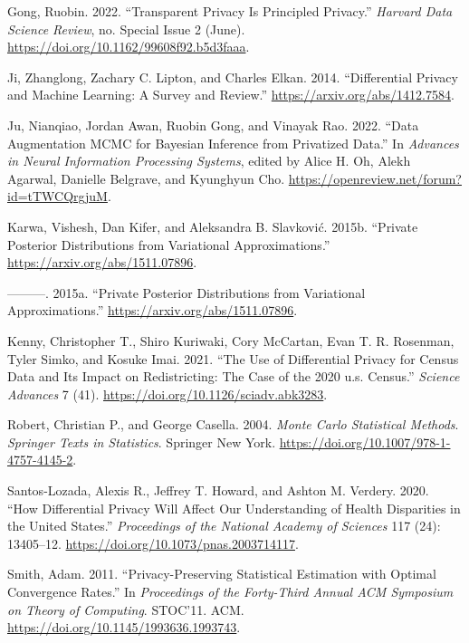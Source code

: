 \begin{CSLReferences}{1}{0}
\leavevmode{}%
Gong, Ruobin. 2022. {``Transparent Privacy Is Principled Privacy.''} \emph{Harvard Data Science Review}, no. Special Issue 2 (June). \url{https://doi.org/10.1162/99608f92.b5d3faaa}.

\leavevmode{}%
Ji, Zhanglong, Zachary C. Lipton, and Charles Elkan. 2014. {``Differential Privacy and Machine Learning: A Survey and Review.''} \url{https://arxiv.org/abs/1412.7584}.

\leavevmode{}%
Ju, Nianqiao, Jordan Awan, Ruobin Gong, and Vinayak Rao. 2022. {``Data Augmentation {MCMC} for Bayesian Inference from Privatized Data.''} In \emph{Advances in Neural Information Processing Systems}, edited by Alice H. Oh, Alekh Agarwal, Danielle Belgrave, and Kyunghyun Cho. \url{https://openreview.net/forum?id=tTWCQrgjuM}.

\leavevmode{}%
Karwa, Vishesh, Dan Kifer, and Aleksandra B. Slavković. 2015b. {``Private Posterior Distributions from Variational Approximations.''} \url{https://arxiv.org/abs/1511.07896}.

\leavevmode{}%
---------. 2015a. {``Private Posterior Distributions from Variational Approximations.''} \url{https://arxiv.org/abs/1511.07896}.

\leavevmode{}%
Kenny, Christopher T., Shiro Kuriwaki, Cory McCartan, Evan T. R. Rosenman, Tyler Simko, and Kosuke Imai. 2021. {``The Use of Differential Privacy for Census Data and Its Impact on Redistricting: The Case of the 2020 u.s. Census.''} \emph{Science Advances} 7 (41). \url{https://doi.org/10.1126/sciadv.abk3283}.

\leavevmode{}%
Robert, Christian P., and George Casella. 2004. \emph{Monte Carlo Statistical Methods}. \emph{Springer Texts in Statistics}. Springer New York. \url{https://doi.org/10.1007/978-1-4757-4145-2}.

\leavevmode{}%
Santos-Lozada, Alexis R., Jeffrey T. Howard, and Ashton M. Verdery. 2020. {``How Differential Privacy Will Affect Our Understanding of Health Disparities in the United States.''} \emph{Proceedings of the National Academy of Sciences} 117 (24): 13405--12. \url{https://doi.org/10.1073/pnas.2003714117}.

\leavevmode{}%
Smith, Adam. 2011. {``Privacy-Preserving Statistical Estimation with Optimal Convergence Rates.''} In \emph{Proceedings of the Forty-Third Annual ACM Symposium on Theory of Computing}. STOC'11. ACM. \url{https://doi.org/10.1145/1993636.1993743}.


\end{CSLReferences}
